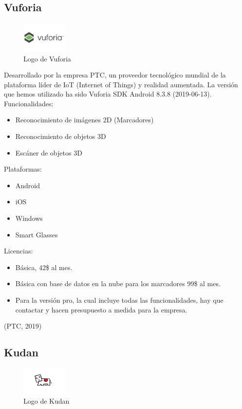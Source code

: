 \subsection{Vuforia}
\begin{figure}[H]
    \centering
    \includegraphics[width=0.2\textwidth]{Images/Vuforia.jpeg}
    \caption{Logo de Vuforia}
    \label{fig:Maxst}
\end{figure}
Desarrollado por la empresa PTC, un proveedor tecnológico mundial de la plataforma líder de IoT (Internet of Things) y realidad aumentada. La versión que hemos utilizado ha sido Vuforia SDK Android 8.3.8 (2019-06-13).
Funcionalidades:
\begin{itemize}
\item Reconocimiento de imágenes 2D (Marcadores)
\item Reconocimiento de objetos 3D
\item Escáner de objetos 3D
\end{itemize}
Plataformas:
\begin{itemize}
\item Android
\item iOS
\item Windows
\item Smart Glasses
\end{itemize}
Licencias:
\begin{itemize}
\item Básica, 42\$ al mes.
\item Básica con base de datos en la nube para los marcadores 99\$ al mes.
\item Para la versión pro, la cual incluye todas las funcionalidades, hay que contactar y hacen presupuesto a medida para la empresa.
\end{itemize}
(PTC, 2019)

\subsection{Kudan}
 \begin{figure}[H]
    \centering
    \includegraphics[width=0.2\textwidth]{Images/Kudan_Logo.png}
    \caption{Logo de Kudan}
    \label{fig:Kudan}
\end{figure}

